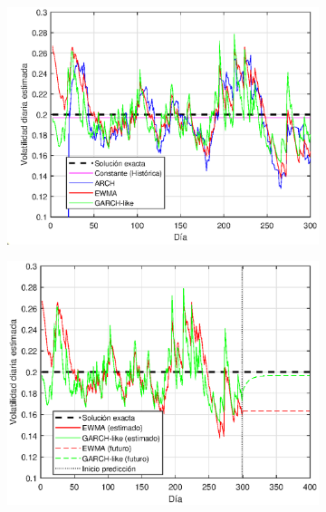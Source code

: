 \begin{figure}[H]
    \centering
    \begin{subfigure}[b]{0.45\linewidth}
        \includegraphics[width=\linewidth]{Imagenes/Parte1/7_Volatilidad/Volatilidad.eps}
    \end{subfigure}
    \begin{subfigure}[b]{0.5\linewidth}
        \includegraphics[width=\linewidth]{Imagenes/Parte1/7_Volatilidad/Volatilidad_Prediccion.eps}
    \end{subfigure}
    \begin{subfigure}[b]{0.45\linewidth}

\end{subfigure}
\end{figure}
